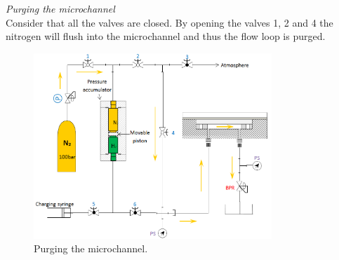 \noindent \textit{Purging the microchannel}\\

Consider that all the valves are closed. By opening the valves 1, 2 and 4 the nitrogen will flush into the microchannel and thus the flow loop is purged.\\
\clearpage

\begin{figure}[!h]%
\centering
\includegraphics[width=0.8\textwidth]{figures/designandfabrication/figure3_37}%
\caption{Purging the microchannel.}%
\label{figure3_37}%
\end{figure}




